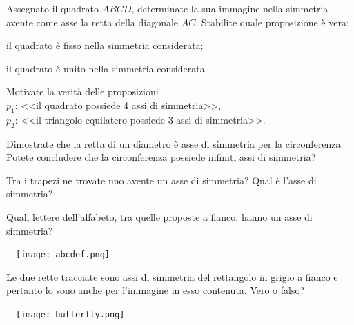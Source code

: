 \begin{esercizio}
\label{ese:8.20}
Assegnato il quadrato $ABCD$, determinate la sua immagine nella simmetria avente come asse la retta della diagonale $AC$. Stabilite quale proposizione è vera:
\begin{enumeratea}
\item il quadrato è fisso nella simmetria considerata;
\item il quadrato è unito nella simmetria considerata.
\end{enumeratea}
\end{esercizio}

\begin{esercizio}
\label{ese:8.21}
Motivate la verità delle proposizioni\\
$p_1$: <<il quadrato possiede 4 assi di simmetria>>,\\
$p_2$: <<il triangolo equilatero possiede 3 assi di simmetria>>.
\end{esercizio}

\begin{esercizio}
\label{ese:8.22}
Dimostrate che la retta di un diametro è asse di simmetria per la circonferenza. Potete concludere che la circonferenza possiede infiniti assi di simmetria?
\end{esercizio}

\begin{esercizio}
\label{ese:8.23}
Tra i trapezi ne trovate uno avente un asse di simmetria? Qual è l'asse di simmetria? 
\end{esercizio}

\noindent\begin{minipage}{0.8\textwidth}\parindent15pt
\begin{esercizio}
\label{ese:8.24}
Quali lettere dell'alfabeto, tra quelle proposte a fianco, hanno un asse di simmetria?
\end{esercizio}
\end{minipage}\hfil
\begin{minipage}{0.2\textwidth}
	\centering~~\texttt{[image: abcdef.png]}
\end{minipage}\vspace{3pt}

\noindent\begin{minipage}{0.75\textwidth}\parindent15pt
\begin{esercizio}
	\label{ese:8.25}
	Le due rette tracciate sono assi di simmetria del rettangolo in grigio a fianco e pertanto lo sono anche per l'immagine in esso contenuta. Vero o falso?
\end{esercizio}
\end{minipage}\hfil
\begin{minipage}{0.25\textwidth}
	\centering~~\texttt{[image: butterfly.png]}
\end{minipage}%

